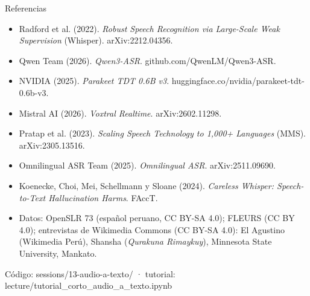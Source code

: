 \documentclass[aspectratio=169,11pt]{beamer}
\newcommand{\cod}[1]{{\small\ttfamily #1}}
\begin{document}
\begin{frame}{Referencias}
  \footnotesize
  \begin{itemize}
    \item Radford et al. (2022). \emph{Robust Speech Recognition via Large-Scale Weak Supervision} (Whisper). arXiv:2212.04356.
    \item Qwen Team (2026). \emph{Qwen3-ASR}. github.com/QwenLM/Qwen3-ASR.
    \item NVIDIA (2025). \emph{Parakeet TDT 0.6B v3}. huggingface.co/nvidia/parakeet-tdt-0.6b-v3.
    \item Mistral AI (2026). \emph{Voxtral Realtime}. arXiv:2602.11298.
    \item Pratap et al. (2023). \emph{Scaling Speech Technology to 1,000+ Languages} (MMS). arXiv:2305.13516.
    \item Omnilingual ASR Team (2025). \emph{Omnilingual ASR}. arXiv:2511.09690.
    \item Koenecke, Choi, Mei, Schellmann y Sloane (2024). \emph{Careless Whisper: Speech-to-Text Hallucination Harms}. FAccT.
    \item Datos: OpenSLR 73 (español peruano, CC BY-SA 4.0); FLEURS (CC BY 4.0); entrevistas de Wikimedia Commons (CC BY-SA 4.0):
          El Agustino (Wikimedia Perú), Shansha (\emph{Qurakuna Rimaykuy}), Minnesota State University, Mankato.
  \end{itemize}
  \vspace{6pt}
  \normalsize Código: \cod{sessions/13-audio-a-texto/} · tutorial: \cod{lecture/tutorial\_corto\_audio\_a\_texto.ipynb}
\end{frame}
\end{document}
